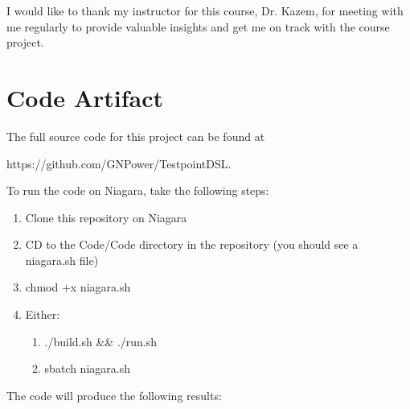 \documentclass[sigconf,authordraft]{acmart}
\begin{document}
\begin{acks}
I would like to thank my instructor for this course, Dr. Kazem, for meeting with me regularly to provide valuable insights and get me on track with the course project.
\end{acks}




\appendix

\section{Code Artifact}

The full source code for this project can be found at

https://github.com/GNPower/TestpointDSL. 

To run the code on Niagara, take the following steps:

\begin{enumerate}
  \item Clone this repository on Niagara
  \item CD to the Code/Code directory in the repository (you should see a niagara.sh file)
  \item chmod +x niagara.sh
  \item Either:
  \begin{enumerate}
        \item ./build.sh \&\& ./run.sh
        \item sbatch niagara.sh
    \end{enumerate}
\end{enumerate}

The code will produce the following results:
\end{document}

